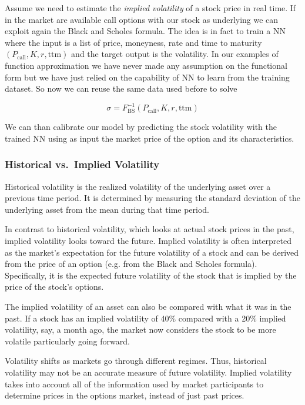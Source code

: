 Assume we need to estimate the \emph{implied volatility} of a stock price
in real time. If in the market are available call options with our stock
as underlying we can exploit again the Black and Scholes formula. The
idea is in fact to train a NN where the input is a list of price,
moneyness, rate and time to maturity
\((P_\textrm{call}, K, r, \mathrm{ttm})\) and the target output is the
volatility. In our examples of function approximation we have never made any assumption on the functional form but we have just relied on the capability of NN to learn from the training dataset. So now we can reuse the same data used before to solve

\begin{equation} \sigma = F^{-1}_\textrm{BS}(P_\textrm{call}, K, r, \mathrm{ttm})\end{equation}

We can than calibrate our model by predicting the stock volatility with
the trained NN using as input the market price of the option and its
characteristics.

\subsubsection{Historical vs.~Implied
		Volatility}\label{historical-vs.-implied-volatility}

Historical volatility is the realized volatility of the underlying asset over a previous time period. It is determined by measuring the standard deviation of the underlying asset from the mean during that time period.

In contrast to historical volatility, which looks at actual stock prices in the past, implied volatility looks toward the future. Implied volatility is often interpreted as the market's expectation for the future volatility of a stock and can be derived from the price of an option (e.g. from the Black and Scholes formula).
Specifically, it is the expected future volatility of the stock that is implied by the price of the stock's options.

The implied volatility of an asset can also be compared with what it was in the past. If a stock has an implied volatility of 40\% compared with a 20\% implied volatility, say, a month ago, the market now considers the stock to be more volatile particularly going forward.

Volatility shifts as markets go through different regimes. Thus, historical volatility may not be an accurate measure of future volatility. Implied volatility
takes into account all of the information used by market participants to 
determine prices in the options market, instead of just past prices.

